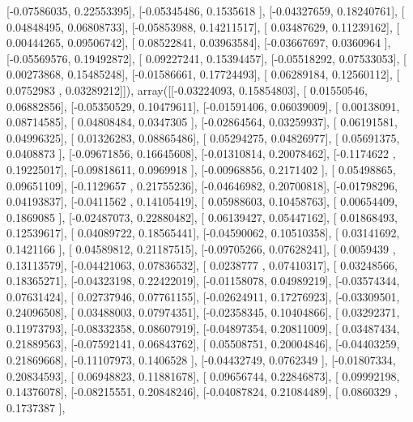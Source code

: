 \documentclass{article}
\begin{document}
       [-0.07586035,  0.22553395],
       [-0.05345486,  0.1535618 ],
       [-0.04327659,  0.18240761],
       [ 0.04848495,  0.06808733],
       [-0.05853988,  0.14211517],
       [ 0.03487629,  0.11239162],
       [ 0.00444265,  0.09506742],
       [ 0.08522841,  0.03963584],
       [-0.03667697,  0.0360964 ],
       [-0.05569576,  0.19492872],
       [ 0.09227241,  0.15394457],
       [-0.05518292,  0.07533053],
       [ 0.00273868,  0.15485248],
       [-0.01586661,  0.17724493],
       [ 0.06289184,  0.12560112],
       [ 0.0752983 ,  0.03289212]]), array([[-0.03224093,  0.15854803],
       [ 0.01550546,  0.06882856],
       [-0.05350529,  0.10479611],
       [-0.01591406,  0.06039009],
       [ 0.00138091,  0.08714585],
       [ 0.04808484,  0.0347305 ],
       [-0.02864564,  0.03259937],
       [ 0.06191581,  0.04996325],
       [ 0.01326283,  0.08865486],
       [ 0.05294275,  0.04826977],
       [ 0.05691375,  0.0408873 ],
       [-0.09671856,  0.16645608],
       [-0.01310814,  0.20078462],
       [-0.1174622 ,  0.19225017],
       [-0.09818611,  0.0969918 ],
       [-0.00968856,  0.2171402 ],
       [ 0.05498865,  0.09651109],
       [-0.1129657 ,  0.21755236],
       [-0.04646982,  0.20700818],
       [-0.01798296,  0.04193837],
       [-0.0411562 ,  0.14105419],
       [ 0.05988603,  0.10458763],
       [ 0.00654409,  0.1869085 ],
       [-0.02487073,  0.22880482],
       [ 0.06139427,  0.05447162],
       [ 0.01868493,  0.12539617],
       [ 0.04089722,  0.18565441],
       [-0.04590062,  0.10510358],
       [ 0.03141692,  0.1421166 ],
       [ 0.04589812,  0.21187515],
       [-0.09705266,  0.07628241],
       [ 0.0059439 ,  0.13113579],
       [-0.04421063,  0.07836532],
       [ 0.0238777 ,  0.07410317],
       [ 0.03248566,  0.18365271],
       [-0.04323198,  0.22422019],
       [-0.01158078,  0.04989219],
       [-0.03574344,  0.07631424],
       [ 0.02737946,  0.07761155],
       [-0.02624911,  0.17276923],
       [-0.03309501,  0.24096508],
       [ 0.03488003,  0.07974351],
       [-0.02358345,  0.10404866],
       [ 0.03292371,  0.11973793],
       [-0.08332358,  0.08607919],
       [-0.04897354,  0.20811009],
       [ 0.03487434,  0.21889563],
       [-0.07592141,  0.06843762],
       [ 0.05508751,  0.20004846],
       [-0.04403259,  0.21869668],
       [-0.11107973,  0.1406528 ],
       [-0.04432749,  0.0762349 ],
       [-0.01807334,  0.20834593],
       [ 0.06948823,  0.11881678],
       [ 0.09656744,  0.22846873],
       [ 0.09992198,  0.14376078],
       [-0.08215551,  0.20848246],
       [-0.04087824,  0.21084489],
       [ 0.0860329 ,  0.1737387 ],
\end{document}

